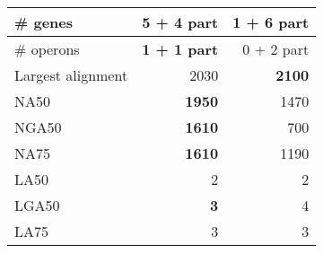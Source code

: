 \documentclass[12pt,a4paper]{article}
\begin{document}
\begin{table}[ht]
\begin{center}
\begin{tabular}{|l*{2}{|r}|}
\# genes & {\bf 5 + 4 part} & 1 + 6 part \\ \hline
\# operons & {\bf 1 + 1 part} & 0 + 2 part \\ \hline
Largest alignment & 2030 & {\bf 2100} \\ \hline
NA50 & {\bf 1950} & 1470 \\ \hline
NGA50 & {\bf 1610} & 700 \\ \hline
NA75 & {\bf 1610} & 1190 \\ \hline
LA50 & 2 & 2 \\ \hline
LGA50 & {\bf 3} & 4 \\ \hline
LA75 & 3 & 3 \\ \hline
\end{tabular}
\end{center}
\end{table}
\end{document}
